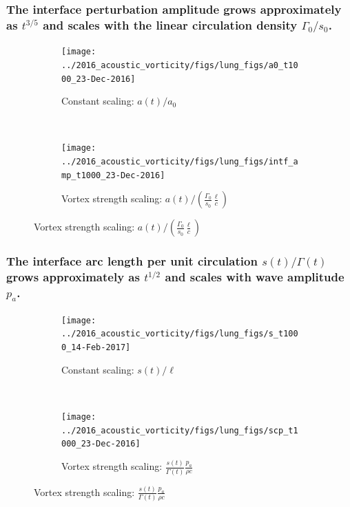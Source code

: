 \begin{frame}
  \frametitle{The interface perturbation amplitude grows approximately as $t^{3/5}$ and scales with the linear circulation density $\Gamma_0/s_0$.}
  \begin{figure}
    \centering
    \begin{subfigure}[t]{0.45\textwidth}
      \centering
      \texttt{[image: ../2016\_acoustic\_vorticity/figs/lung\_figs/a0\_t1000\_23-Dec-2016]}
      \caption{\label{fig:trapz_interface_t1000} Constant scaling: $a(t)/a_0$}
    \end{subfigure}
    ~
    \begin{subfigure}[t]{0.45\textwidth}
      \centering
      \texttt{[image: ../2016\_acoustic\_vorticity/figs/lung\_figs/intf\_amp\_t1000\_23-Dec-2016]}
      \caption{Vortex strength scaling: $a(t)/\left(\frac{\Gamma_0}{s_0}\frac{\ell}{c}\right)$}
    \end{subfigure}
  \end{figure}
\end{frame}
%
%
\begin{frame}
  \frametitle{The interface arc length per unit circulation $s(t)/\Gamma(t)$ grows approximately as $t^{1/2}$ and scales with wave amplitude $p_a$.}
  \begin{figure}
    \centering
    \begin{subfigure}[t]{0.45\textwidth}
      \centering
      \texttt{[image: ../2016\_acoustic\_vorticity/figs/lung\_figs/s\_t1000\_14-Feb-2017]}
      \caption{\label{fig:trapz_interface_t1000} Constant scaling: $s(t)/\ell$}
    \end{subfigure}
    ~
    \begin{subfigure}[t]{0.45\textwidth}
      \centering
      \texttt{[image: ../2016\_acoustic\_vorticity/figs/lung\_figs/scp\_t1000\_23-Dec-2016]}
      \caption{Vortex strength scaling: $\frac{s(t)}{\Gamma(t)}\frac{p_a}{\rho c}$}
    \end{subfigure}
  \end{figure}
\end{frame}
% 
% 
